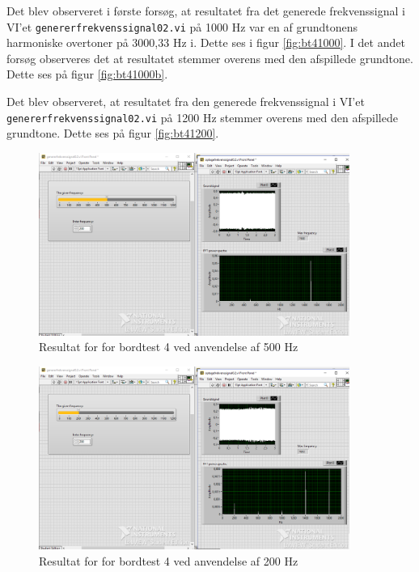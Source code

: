 			 Det blev observeret i første forsøg, at resultatet fra det generede frekvenssignal i VI'et \texttt{genererfrekvenssignal02.vi} på 1000 Hz var en af grundtonens harmoniske overtoner på 3000,33 Hz i. Dette ses i figur \ref{fig:bt41000}. I det andet forsøg observeres det at resultatet stemmer overens med den afspillede grundtone. Dette ses på figur \ref{fig:bt41000b}.  
			 
			 Det blev observeret, at resultatet fra den generede frekvenssignal i VI'et \texttt{genererfrekvenssignal02.vi} på 1200 Hz stemmer overens med den afspillede grundtone. Dette ses på figur \ref{fig:bt41200}.  
			 
			\begin{figure}[htb]
			\centering
				\includegraphics[width=4in]{Bordtest4500Hz}
				\caption{Resultat for for bordtest 4 ved anvendelse af 500 Hz}	
				\label{fig:bt4500}
			\end{figure} 
			
			\begin{figure}[htb]
			\centering
				\includegraphics[width=4in]{Bordtest4200Hz}
				\caption{Resultat for for bordtest 4 ved anvendelse af 200 Hz}	
				\label{fig:bt4200}
			\end{figure} 
			
